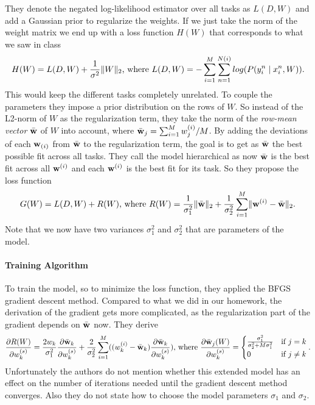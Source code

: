 They denote the negated log-likelihood estimator over all tasks as $L(D,W)$ and add a Gaussian prior to regularize the weights. If we just take the norm of the weight matrix we end up with a loss function $H(W)$ that corresponds to what we saw in class
\begin{align*}
H(W) = L(D,W) + \frac{1}{\sigma^2} \lVert W\rVert_2 \text{, where } L(D,W) = -\sum_{i=1}^{M} \sum_{n=1}^{N(i)} log(P(y_i^n \mid x_i^n, W)).
\end{align*}
This would keep the different tasks completely unrelated. To couple the parameters they impose a prior distribution on the rows of $W$. So instead of the L2-norm of $W$ as the regularization term, they take the norm of the \emph{row-mean vector} $\bar{\textbf{w}}$ of $W$ into account, where $\bar{\textbf{w}}_j = \sum_{i=1}^M w_{j}^{(i)}/M$.
By adding the deviations of each $\textbf{w}_{(i)}$ from $\bar{\textbf{w}}$ to the regularization term, the goal is to get as $\bar{\textbf{w}}$ the best possible fit across all tasks. They call the model hierarchical as now $\bar{\textbf{w}}$ is the best fit across all $\textbf{w}^{(i)}$ and each $\textbf{w}^{(i)}$ is the best fit for its task. So they propose the loss function
\begin{align*}
G(W) = L(D,W) + R(W) \text{, where } R(W) = \frac{1}{\sigma_1^2} \lVert\bar{\textbf{w}}\rVert_2 + \frac{1}{\sigma_2^2} \sum_{i=1}^M \lVert\textbf{w}^{(i)} - \bar{\textbf{w}}\rVert_2.
\end{align*}
Note that we now have two variances $\sigma_1^2$ and $\sigma_2^2$ that are parameters of the model.

\paragraph{Training Algorithm}
To train the model, so to minimize the loss function, they applied the BFGS gradient descent method. Compared to what we did in our homework, the derivation of the gradient gets more complicated, as the regularization part of the gradient depends on $\bar{\textbf{w}}$ now. They derive
\begin{align*}
\frac{\partial R(W)}{\partial w_k^{(s)}} = \frac{2 w_k}{\sigma_1^2}\frac{\partial \bar{\textbf{w}}_k}{\partial w_k^{(s)}} + \frac{2}{\sigma_2^2} \sum_{i=1}^{M}((w_k^{(i)} - \bar{\textbf{w}}_k)\frac{\partial\bar{\textbf{w}}_k}{\partial w_k^{(s)}}) \text{, where } \frac{\partial \bar{\textbf{w}}_j(W)}{\partial w_k^{(s)}} = \begin{cases} \frac{\sigma_1^2}{\sigma_2^2 + M\sigma_1^2} & \text{if } j=k\\
0 & \text{if } j\neq k
\end{cases}.
\end{align*}
Unfortunately the authors do not mention whether this extended model has an effect on the number of iterations needed until the gradient descent method converges. Also they do not state how to choose the model parameters $\sigma_1$ and $\sigma_2$.
